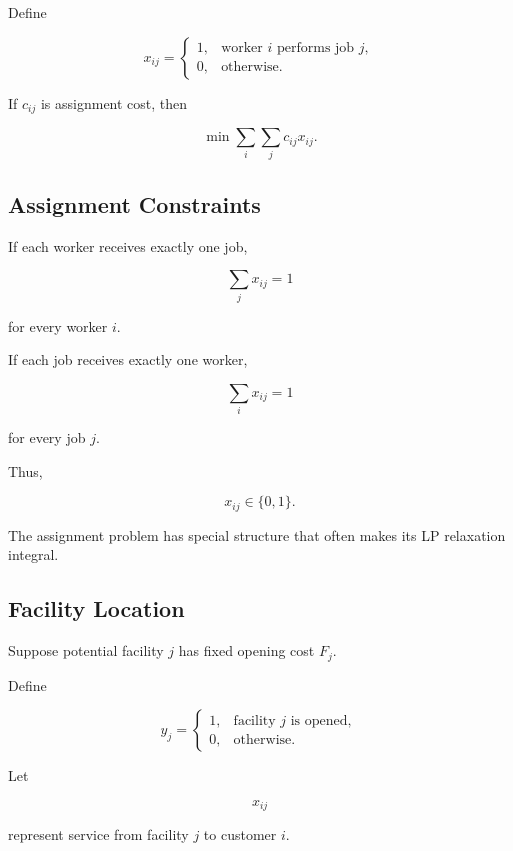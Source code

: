 Define

\[
\boxed{
x_{ij}
=
\begin{cases}
1,
&
\text{worker }i\text{ performs job }j,
\\
0,
&
\text{otherwise}.
\end{cases}
}
\]

If \(c_{ij}\) is assignment cost, then

\[
\boxed{
\min
\sum_i
\sum_j
c_{ij}x_{ij}.
}
\]

\subsection{Assignment Constraints}
\label{subsec:assignment-constraints}

If each worker receives exactly one job,

\[
\boxed{
\sum_j
x_{ij}
=
1
}
\]

for every worker \(i\).

If each job receives exactly one worker,

\[
\boxed{
\sum_i
x_{ij}
=
1
}
\]

for every job \(j\).

Thus,

\[
\boxed{
x_{ij}\in\{0,1\}.
}
\]

The assignment problem has special structure that often makes its LP
relaxation integral.

\subsection{Facility Location}
\label{subsec:facility-location}

Suppose potential facility \(j\) has fixed opening cost \(F_j\).

Define

\[
\boxed{
y_j
=
\begin{cases}
1,
&
\text{facility }j\text{ is opened},
\\
0,
&
\text{otherwise}.
\end{cases}
}
\]

Let

\[
x_{ij}
\]

represent service from facility \(j\) to customer \(i\).

